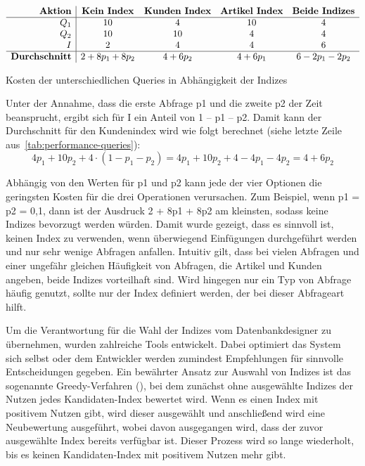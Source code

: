 \vspace{-18pt}
\begin{table}[H]
    \centering
    \setlength{\arrayrulewidth}{0.4mm}
    \[
        \begin{array}{r|c c c c}
            \textbf{Aktion} & \textbf{Kein Index} & \textbf{Kunden Index} & \textbf{Artikel Index} & \textbf{Beide Indizes} \\ \hline
            Q_1 & 10 & 4 & 10 & 4 \\
            Q_2 & 10 & 10 & 4 & 4 \\
            I   & 2  & 4  & 4  & 6 \\ \hline
            \textbf{Durchschnitt} & 2 + 8p_1 + 8p_2 & 4 + 6p_2 & 4 + 6p_1 & 6-2p_1-2p_2 \\
        \end{array}
    \]
    \vspace{-5pt}
    \caption[Performance-Vergleich]{Kosten der unterschiedlichen Queries in Abhängigkeit der Indizes}
    \label{tab:performance-queries}
\end{table}
\vspace{-25pt}

Unter der Annahme, dass die erste Abfrage p1 und die zweite p2 der Zeit beansprucht, ergibt sich für I ein Anteil von 1 – p1 – p2.
Damit kann der Durchschnitt für den Kundenindex wird wie folgt berechnet (siehe letzte Zeile aus~\ref{tab:performance-queries}):
\[
    4p_{1} + 10p_{2} + 4 \cdot (1 - p_{1} - p_{2}) = 4p_{1} + 10p_{2} + 4 - 4p_{1} - 4p_{2} = 4 + 6p_{2}
\]

Abhängig von den Werten für p1 und p2 kann jede der vier Optionen die geringsten Kosten für die drei Operationen verursachen.
Zum Beispiel, wenn p1 = p2 = 0,1, dann ist der Ausdruck 2 + 8p1 + 8p2 am kleinsten, sodass keine Indizes bevorzugt werden würden.
Damit wurde gezeigt, dass es sinnvoll ist, keinen Index zu verwenden, wenn überwiegend Einfügungen durchgeführt werden und nur sehr wenige Abfragen anfallen.
Intuitiv gilt, dass bei vielen Abfragen und einer ungefähr gleichen Häufigkeit von Abfragen, die Artikel und Kunden angeben, beide Indizes vorteilhaft sind.
Wird hingegen nur ein Typ von Abfrage häufig genutzt, sollte nur der Index definiert werden, der bei dieser Abfrageart hilft.

Um die Verantwortung für die Wahl der Indizes vom Datenbankdesigner zu übernehmen, wurden zahlreiche Tools entwickelt.
Dabei optimiert das System sich selbst oder dem Entwickler werden zumindest Empfehlungen für sinnvolle Entscheidungen gegeben.
Ein bewährter Ansatz zur Auswahl von Indizes ist das sogenannte Greedy-Verfahren (\cite[S. 824]{garcia2008database}), bei dem zunächst ohne ausgewählte Indizes der Nutzen jedes Kandidaten-Index bewertet wird.
Wenn es einen Index mit positivem Nutzen gibt, wird dieser ausgewählt und anschließend wird eine Neubewertung ausgeführt, wobei davon ausgegangen wird, dass der zuvor ausgewählte Index bereits verfügbar ist.
Dieser Prozess wird so lange wiederholt, bis es keinen Kandidaten-Index mit positivem Nutzen mehr gibt.

